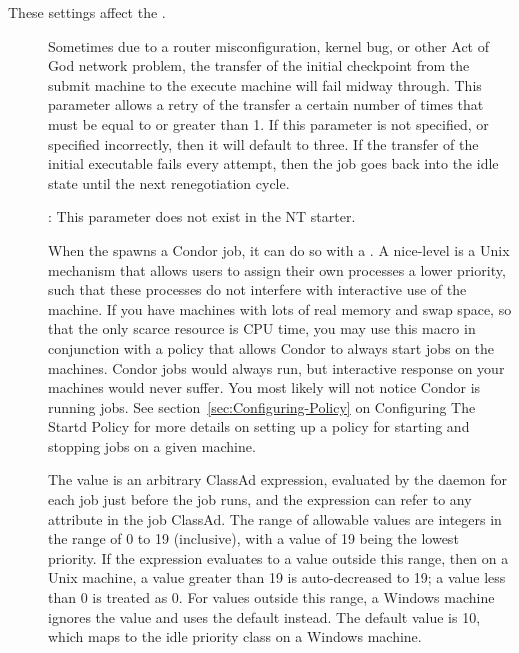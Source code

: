 These settings affect the .
\begin{description}

\item[] \label{param:ExecTransferAttempts}
  Sometimes due to a router misconfiguration, kernel bug, or other Act
  of God network problem, the transfer of the initial checkpoint from
  the submit machine to the execute machine will fail midway through.
  This parameter allows a retry of the transfer a certain number of times
  that must be equal to or greater than 1. If this parameter is not
  specified, or specified incorrectly, then it will default to three.
  If the transfer of the initial executable fails every attempt, then
  the job goes back into the idle state until the next renegotiation
  cycle.

  \Note: This parameter does not exist in the NT starter.

\item[] \label{param:JobReniceIncrement}
  When the  spawns a Condor job, it can do so with a
  .
  A nice-level is a
  Unix mechanism that allows users to assign their own processes a lower 
  priority, such that these processes do not interfere with interactive
  use of the machine.
  If you have machines with lots
  of real memory and swap space, so that the only scarce resource is CPU time,
  you may use this macro in conjunction with a policy that
  allows Condor to always start jobs on the machines. 
  Condor jobs would always run,
  but interactive response on your machines would never suffer.
  You most likely will not notice Condor is
  running jobs.  See section~\ref{sec:Configuring-Policy} on
  Configuring The Startd Policy for more details on setting up a
  policy for starting and stopping jobs on a given machine.

  The value is an arbitrary ClassAd expression,
  evaluated by the  daemon for each job just before the
  job runs, and the expression can refer to any attribute in the job ClassAd.
  The range of allowable values are integers in the range of 0 to 19
  (inclusive),
  with a value of 19 being the lowest priority.  
  If the expression evaluates to a value outside this range,
  then on a Unix machine, a value greater than 19 is auto-decreased to 19;
  a value less than 0 is treated as 0.
  For values outside this range, a Windows machine ignores the value
  and uses the default instead.
  The default value is 10, which maps to the idle priority class on
  a Windows machine.


\end{description}
